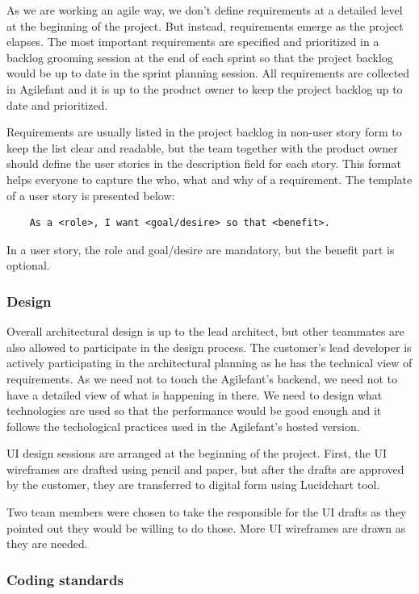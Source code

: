 As we are working an agile way, we don't define requirements at a detailed level
at the beginning of the project. But instead, requirements emerge as the
project elapses. The most important requirements are specified and prioritized
in a backlog grooming session at the end of each sprint so that the project backlog
would be up to date in the sprint planning session. All requirements are
collected in Agilefant and it is up to the product owner to keep the project
backlog up to date and prioritized.

Requirements are usually listed in the project backlog in non-user story form to
keep the list clear and readable, but the team together with the product owner
should define the user stories in the description field for each story. This
format helps everyone to capture the who, what and why of a requirement. The
template of a user story is presented below:

\begin{verbatim}
    As a <role>, I want <goal/desire> so that <benefit>.
\end{verbatim}

In a user story, the role and goal/desire are mandatory, but the benefit part is 
optional.

\subsubsection{Design}

Overall architectural design is up to the lead architect, but other teammates
are also allowed to participate in the design process. The customer's lead
developer is actively participating in the architectural planning as he has the
technical view of requirements. As we need not to touch the Agilefant's backend,
we need not to have a detailed view of what is happening in there. We need to
design what technologies are used so that the performance would be good enough and it
follows the techological practices used in the Agilefant's hosted version.

UI design sessions are arranged at the beginning of the project. First, the UI
wireframes are drafted using pencil and paper, but after the drafts are approved
by the customer, they are transferred to digital form using Lucidchart tool.

Two team members were chosen to take the responsible for the UI drafts as they
pointed out they would be willing to do those. More UI wireframes are drawn as
they are needed.

\subsubsection{Coding standards}


